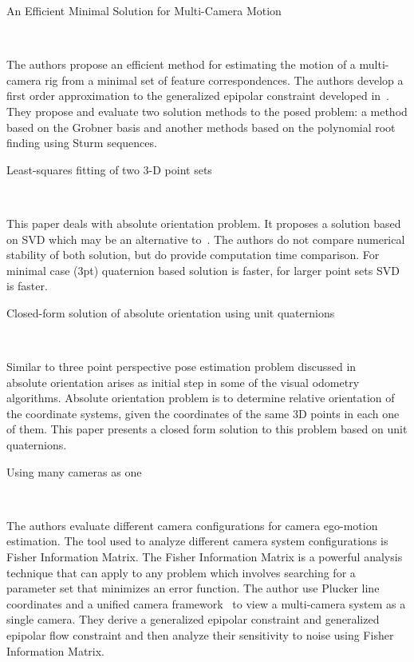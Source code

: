 \documentclass[10pt]{article}         %
\begin{document}
\begin{enumerate}
  {\Large \item An Efficient Minimal Solution for Multi-Camera
    Motion}~\cite{67}

  The authors propose an efficient method for estimating the motion of
  a multi-camera rig from a minimal set of feature correspondences.
  The authors develop a first order approximation to the generalized
  epipolar constraint developed in~\cite{grossberg2001general}.  They
  propose and evaluate two solution methods to the posed problem: a
  method based on the Grobner basis and another methods based on the
  polynomial root finding using Sturm sequences.

  {\Large \item Least-squares fitting of two 3-D point
    sets}~\cite{arun1987least}

  This paper deals with absolute orientation problem.  It proposes a
  solution based on SVD which may be an alternative
  to~\cite{horn1987closed}.  The authors do not compare numerical
  stability of both solution, but do provide computation time
  comparison.  For minimal case (3pt) quaternion based solution is
  faster, for larger point sets SVD is faster.

  {\Large \item Closed-form solution of absolute orientation using
    unit quaternions}~\cite{horn1987closed}
  
  Similar to three point perspective pose estimation problem discussed
  in ~\cite{haralick1991analysis} absolute orientation arises as
  initial step in some of the visual odometry algorithms.  Absolute
  orientation problem is to determine relative orientation of the
  coordinate systems, given the coordinates of the same 3D points in
  each one of them.  This paper presents a closed form solution to
  this problem based on unit quaternions.

  {\Large \item Using many cameras as one}~\cite{pless2003using}
  
  The authors evaluate different camera configurations for camera
  ego-motion estimation.  The tool used to analyze different camera
  system configurations is Fisher Information Matrix.  The Fisher
  Information Matrix is a powerful analysis technique that can apply
  to any problem which involves searching for a parameter set that
  minimizes an error function.  The author use Plucker line
  coordinates and a unified camera
  framework~\cite{grossberg2001general} to view a multi-camera system
  as a single camera.  They derive a generalized epipolar constraint
  and generalized epipolar flow constraint and then analyze their
  sensitivity to noise using Fisher Information Matrix.


\end{enumerate}
\end{document}
